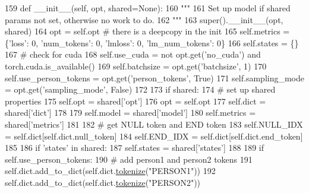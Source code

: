 \begin{DoxyCode}
159     \textcolor{keyword}{def }\_\_init\_\_(self, opt, shared=None):
160         \textcolor{stringliteral}{"""}
161 \textcolor{stringliteral}{        Set up model if shared params not set, otherwise no work to do.}
162 \textcolor{stringliteral}{        """}
163         super().\_\_init\_\_(opt, shared)
164         opt = self.opt  \textcolor{comment}{# there is a deepcopy in the init}
165         self.metrics = \{\textcolor{stringliteral}{'loss'}: 0, \textcolor{stringliteral}{'num\_tokens'}: 0, \textcolor{stringliteral}{'lmloss'}: 0, \textcolor{stringliteral}{'lm\_num\_tokens'}: 0\}
166         self.states = \{\}
167         \textcolor{comment}{# check for cuda}
168         self.use\_cuda = \textcolor{keywordflow}{not} opt.get(\textcolor{stringliteral}{'no\_cuda'}) \textcolor{keywordflow}{and} torch.cuda.is\_available()
169         self.batchsize = opt.get(\textcolor{stringliteral}{'batchsize'}, 1)
170         self.use\_person\_tokens = opt.get(\textcolor{stringliteral}{'person\_tokens'}, \textcolor{keyword}{True})
171         self.sampling\_mode = opt.get(\textcolor{stringliteral}{'sampling\_mode'}, \textcolor{keyword}{False})
172 
173         \textcolor{keywordflow}{if} shared:
174             \textcolor{comment}{# set up shared properties}
175             self.opt = shared[\textcolor{stringliteral}{'opt'}]
176             opt = self.opt
177             self.dict = shared[\textcolor{stringliteral}{'dict'}]
178 
179             self.model = shared[\textcolor{stringliteral}{'model'}]
180             self.metrics = shared[\textcolor{stringliteral}{'metrics'}]
181 
182             \textcolor{comment}{# get NULL token and END token}
183             self.NULL\_IDX = self.dict[self.dict.null\_token]
184             self.END\_IDX = self.dict[self.dict.end\_token]
185 
186             \textcolor{keywordflow}{if} \textcolor{stringliteral}{'states'} \textcolor{keywordflow}{in} shared:
187                 self.states = shared[\textcolor{stringliteral}{'states'}]
188 
189             \textcolor{keywordflow}{if} self.use\_person\_tokens:
190                 \textcolor{comment}{# add person1 and person2 tokens}
191                 self.dict.add\_to\_dict(self.dict.\hyperlink{namespaceparlai_1_1agents_1_1tfidf__retriever_1_1build__tfidf_a1fdb457e98eb4e4c26047e229686a616}{tokenize}(\textcolor{stringliteral}{"PERSON1"}))
192                 self.dict.add\_to\_dict(self.dict.\hyperlink{namespaceparlai_1_1agents_1_1tfidf__retriever_1_1build__tfidf_a1fdb457e98eb4e4c26047e229686a616}{tokenize}(\textcolor{stringliteral}{"PERSON2"}))

\end{DoxyCode}
